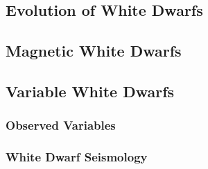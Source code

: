 \subsection{Evolution of White Dwarfs}
\subsection{Magnetic White Dwarfs}
\subsection{Variable White Dwarfs}
\subsubsection{Observed Variables}
\subsubsection{White Dwarf Seismology}
